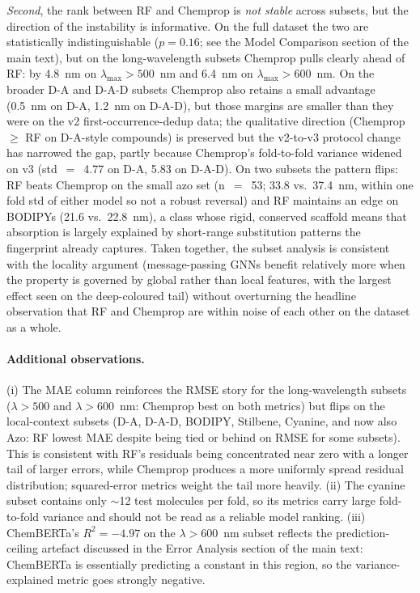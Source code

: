 \documentclass[journal=jcisd8,manuscript=suppinfo]{achemso}
\begin{document}
\textit{Second}, the rank between RF and Chemprop is \emph{not stable} across subsets, but the direction of the instability is informative. On the full dataset the two are statistically indistinguishable ($p = 0.16$; see the Model Comparison section of the main text), but on the long-wavelength subsets Chemprop pulls clearly ahead of RF: by 4.8~nm on $\lambda_{\max} > 500$~nm and 6.4~nm on $\lambda_{\max} > 600$~nm. On the broader D-A and D-A-D subsets Chemprop also retains a small advantage (0.5~nm on D-A, 1.2~nm on D-A-D), but those margins are smaller than they were on the v2 first-occurrence-dedup data; the qualitative direction (Chemprop $\geq$ RF on D-A-style compounds) is preserved but the v2-to-v3 protocol change has narrowed the gap, partly because Chemprop's fold-to-fold variance widened on v3 (std~$=$~4.77 on D-A, 5.83 on D-A-D). On two subsets the pattern flips: RF beats Chemprop on the small azo set (n~$=$~53; 33.8 vs.\ 37.4~nm, within one fold std of either model so not a robust reversal) and RF maintains an edge on BODIPYs (21.6 vs.\ 22.8~nm), a class whose rigid, conserved scaffold means that absorption is largely explained by short-range substitution patterns the fingerprint already captures. Taken together, the subset analysis is consistent with the locality argument (message-passing GNNs benefit relatively more when the property is governed by global rather than local features, with the largest effect seen on the deep-coloured tail) without overturning the headline observation that RF and Chemprop are within noise of each other on the dataset as a whole.

\paragraph{Additional observations.}
(i) The MAE column reinforces the RMSE story for the long-wavelength subsets ($\lambda > 500$ and $\lambda > 600$~nm: Chemprop best on both metrics) but flips on the local-context subsets (D-A, D-A-D, BODIPY, Stilbene, Cyanine, and now also Azo: RF lowest MAE despite being tied or behind on RMSE for some subsets). This is consistent with RF's residuals being concentrated near zero with a longer tail of larger errors, while Chemprop produces a more uniformly spread residual distribution; squared-error metrics weight the tail more heavily.
(ii) The cyanine subset contains only $\sim$12 test molecules per fold, so its metrics carry large fold-to-fold variance and should not be read as a reliable model ranking.
(iii) ChemBERTa's $R^2 = -4.97$ on the $\lambda > 600$~nm subset reflects the prediction-ceiling artefact discussed in the Error Analysis section of the main text: ChemBERTa is essentially predicting a constant in this region, so the variance-explained metric goes strongly negative.
\end{document}
